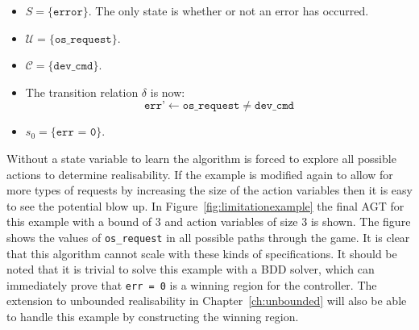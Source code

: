 \begin{itemize}
    \item $S = \{ \texttt{error} \} $. The only state is whether or not an error has occurred. 
    \item $\mathcal{U} = \{ \texttt{os\_request} \} $. 
    \item $\mathcal{C} = \{ \texttt{dev\_cmd} \}$.
    \item The transition relation $\delta$ is now: $$ \texttt{err'} \gets \texttt{os\_request} \neq \texttt{dev\_cmd} $$
    \item $s_0 = \{ \texttt{err = 0} \}$. 
\end{itemize}

Without a state variable to learn the algorithm is forced to explore all possible actions to determine realisability. If the example is modified again to allow for more types of requests by increasing the size of the action variables then it is easy to see the potential blow up. In Figure~\ref{fig:limitationexample} the final AGT for this example with a bound of $3$ and action variables of size $3$ is shown. The figure shows the values of \texttt{os\_request} in all possible paths through the game. It is clear that this algorithm cannot scale with these kinds of specifications. It should be noted that it is trivial to solve this example with a BDD solver, which can immediately prove that \texttt{err = 0} is a winning region for the controller. The extension to unbounded realisability in Chapter~\ref{ch:unbounded} will also be able to handle this example by constructing the winning region.

